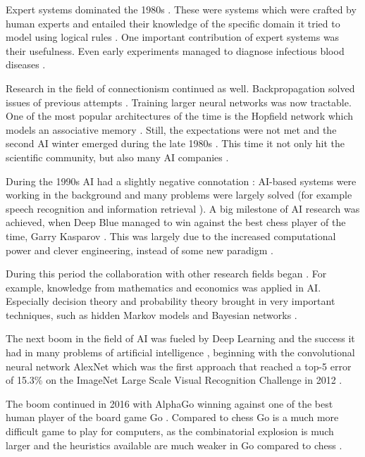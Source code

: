\documentclass[draft,final,oneside]{vutinfth} %
\begin{document}
Expert systems dominated the 1980s \cite{machineswhothink}. These were systems which were crafted by human experts and entailed their knowledge of the specific domain it tried to model using logical rules \cite{questforai}. One important contribution of expert systems was their usefulness. Even early experiments managed to diagnose infectious blood diseases \cite{questforai}. 

Research in the field of connectionism continued as well. Backpropagation solved issues of previous attempts \cite{questforai}\cite{aimodern}. Training larger neural networks was now tractable. One of the most popular architectures of the time is the Hopfield network which models an associative memory \cite{anintroductiontoneuralnetworks}. Still, the expectations were not met and the second AI winter emerged during the late 1980s \cite{machineswhothink}. This time it not only hit the scientific community, but also many AI companies \cite{questforai}.

During the 1990s AI had a slightly negative connotation \cite{avoidai}: AI-based systems were working in the background and many problems were largely solved (for example speech recognition and information retrieval \cite{avoidai}\cite{historyinformationretrieval}). A big milestone of AI research was achieved, when Deep Blue managed to win against the best chess player of the time, Garry Kasparov \cite{questforai}. This was largely due to the increased computational power and clever engineering, instead of some new paradigm \cite{questforai}.

During this period the collaboration with other research fields began \cite{aimodern}. For example, knowledge from mathematics and economics was applied in AI. Especially decision theory and probability theory brought in very important techniques, such as hidden Markov models and Bayesian networks \cite{statisticsinml}\cite{aimodern}.

The next boom in the field of AI was fueled by Deep Learning and the success it had in many problems of artificial intelligence \cite{selfdriving}\cite{nmt}\cite{speech}, beginning with the convolutional neural network AlexNet which was the first approach that reached a top-5 error of 15.3\% on the ImageNet Large Scale Visual Recognition Challenge in 2012  \cite{alexnet}.

The boom continued in 2016 with AlphaGo winning against one of the best human player of the board game Go \cite{alphagopaper}. Compared to chess Go is a much more difficult game to play for computers, as the combinatorial explosion is much larger and the heuristics available are much weaker in Go compared to chess \cite{alphagopaper}.
\end{document}
